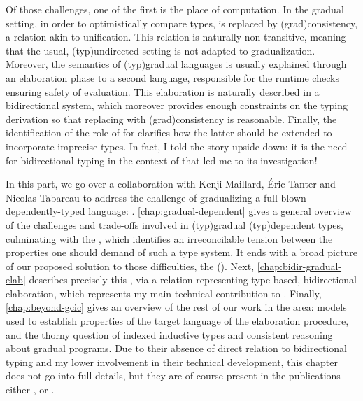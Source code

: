 Of those challenges, one of the first is the place of computation.
In the gradual setting, in order to optimistically compare types,
 is replaced by \kl(grad){consistency}, a relation
akin to unification. This relation is naturally
non-transitive, meaning that the usual, \kl(typ){undirected} setting is not adapted to
gradualization.%
Moreover, the semantics of \kl(typ){gradual} languages is usually explained
through an elaboration phase to a second language, responsible for the runtime checks ensuring
safety of evaluation. This elaboration is naturally described in a bidirectional
system, which moreover provides enough constraints on the typing derivation so that replacing
 with \kl(grad){consistency} is reasonable. Finally, the identification of
the role of  for  clarifies
how the latter should be extended to incorporate imprecise types.
In fact, I told the story upside down: it is the need for bidirectional typing in the context
of  that led me to its investigation!

In this part, we go over a collaboration with Kenji Maillard, Éric Tanter and Nicolas
Tabareau to address the challenge of gradualizing a full-blown dependently-typed language:
 .
\cref{chap:gradual-dependent} gives a general overview of the challenges and trade-offs
involved in \kl(typ){gradual} \kl(typ){dependent} types, culminating with the
, which identifies an irreconcilable tension between
the properties one should demand of such a type system. It ends with a broad picture
of our proposed solution to those difficulties,
the  ().
Next, \cref{chap:bidir-gradual-elab} describes precisely this ,
via a relation representing type-based, bidirectional elaboration,
which represents my main technical contribution to \textcite{LennonBertrand2022}.
Finally, \cref{chap:beyond-gcic} gives an overview of the rest of our work in the area:
models used to establish properties of the target language of the elaboration procedure,
and the thorny question of indexed inductive types and consistent reasoning about gradual
programs.
Due to their absence of direct relation to bidirectional typing and my lower
involvement in their technical development, this chapter does not go into full details,
but they are of course present in the publications –
either , or .